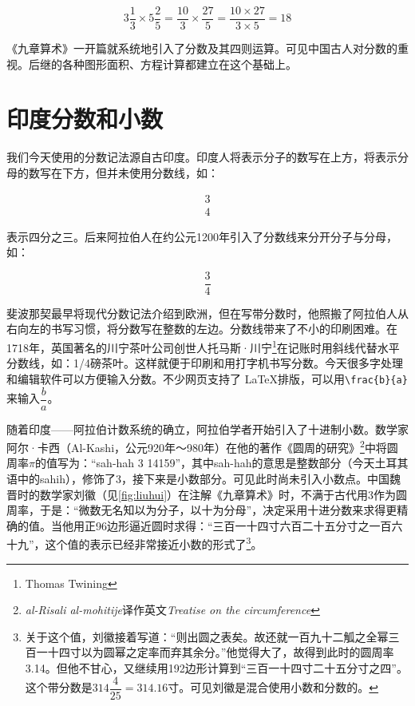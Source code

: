 \documentclass[b5paper]{ctexart}
\begin{document}
\[
3\frac{1}{3} \times 5\frac{2}{5} = \frac{10}{3} \times \frac{27}{5} = \frac{10 \times 27}{3 \times 5} = 18
\]

《九章算术》一开篇就系统地引入了分数及其四则运算。可见中国古人对分数的重视。后继的各种图形面积、方程计算都建立在这个基础上。

\section{印度分数和小数}

我们今天使用的分数记法源自古印度。印度人将表示分子的数写在上方，将表示分母的数写在下方，但并未使用分数线，如：

\begin{align*}
  3 \\
  4
\end{align*}

表示四分之三。后来阿拉伯人在约公元1200年引入了分数线来分开分子与分母\cite{Pumfrey-2011}，如：

\[
\dfrac{3}{4}
\]

斐波那契最早将现代分数记法介绍到欧洲，但在写带分数时，他照搬了阿拉伯人从右向左的书写习惯，将分数写在整数的左边\cite{Miller-2025}。分数线带来了不小的印刷困难。在1718年，英国著名的川宁茶叶公司创世人托马斯·川宁\footnote{Thomas Twining}在记账时用斜线代替水平分数线，如：1/4磅茶叶。这样就便于印刷和用打字机书写分数。今天很多字处理和编辑软件可以方便输入分数。不少网页支持了 \LaTeX 排版，可以用\lstinline|\frac{b}{a}|来输入$\dfrac{b}{a}$。

 
随着印度——阿拉伯计数系统的确立，阿拉伯学者开始引入了十进制小数。数学家阿尔·卡西（Al-Kashi，公元920年～980年）在他的著作《圆周的研究》\footnote{{\em al-Risali al-mohitije}译作英文{\em Treatise on the circumference}}中将圆周率$\pi$的值写为：“sah-hah 3 14159”，其中sah-hah的意思是整数部分（今天土耳其语中的sahih），修饰了3，接下来是小数部分。可见此时尚未引入小数点。中国魏晋时的数学家刘徽（见\cref{fig:liuhui}）在注解《九章算术》时，不满于古代用3作为圆周率，于是：“微数无名知以为分子，以十为分母”，决定采用十进分数来求得更精确的值。当他用正96边形逼近圆时求得：“三百一十四寸六百二十五分寸之一百六十九”，这个值的表示已经非常接近小数的形式了\footnote{关于这个值，刘徽接着写道：“则出圆之表矣。故还就一百九十二觚之全幂三百一十四寸以为圆幂之定率而弃其余分。”他觉得大了，故得到此时的圆周率3.14。但他不甘心，又继续用192边形计算到“三百一十四寸二十五分寸之四”。这个带分数是$314\dfrac{4}{25} = 314.16$寸。可见刘徽是混合使用小数和分数的。}。
\end{document}
